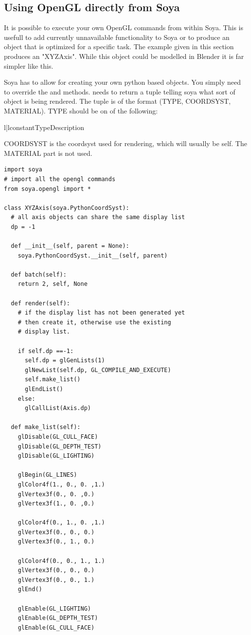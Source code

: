 \subsection{Using OpenGL directly from Soya}

It is possible to execute your own OpenGL commands from within Soya. This is 
usefull to add currently unnavailable functionality to Soya or to produce an 
object that is optimized for a specific task. The example given in this section
produces an "XYZAxis". While this object could be modelled in Blender it is far 
simpler like this. 

Soya has  to allow for creating your own python 
based objects. You simply need to override the  and 
 methods.  needs to return a tuple 
telling soya what sort of object is being rendered. The tuple is 
of the format (TYPE, COORDSYST, MATERIAL). TYPE should be on of the following:
\begin{tableii}{l|l}{constant}{Type}{Description}
\end{tableii}

COORDSYST is the coordsyst used for rendering, which will usually be self.
The MATERIAL part is not used. 

\begin{verbatim}
import soya
# import all the opengl commands
from soya.opengl import *

class XYZAxis(soya.PythonCoordSyst):
  # all axis objects can share the same display list
  dp = -1

  def __init__(self, parent = None):
    soya.PythonCoordSyst.__init__(self, parent)

  def batch(self):
    return 2, self, None

  def render(self):
    # if the display list has not been generated yet 
    # then create it, otherwise use the existing 
    # display list. 

    if self.dp ==-1:
      self.dp = glGenLists(1)
      glNewList(self.dp, GL_COMPILE_AND_EXECUTE)
      self.make_list()
      glEndList()
    else:
      glCallList(Axis.dp)

  def make_list(self):
    glDisable(GL_CULL_FACE)
    glDisable(GL_DEPTH_TEST)
    glDisable(GL_LIGHTING)

    glBegin(GL_LINES)
    glColor4f(1., 0., 0. ,1.)
    glVertex3f(0., 0. ,0.)
    glVertex3f(1., 0. ,0.)
    
    glColor4f(0., 1., 0. ,1.)
    glVertex3f(0., 0., 0.)
    glVertex3f(0., 1., 0.)
    
    glColor4f(0., 0., 1., 1.)
    glVertex3f(0., 0., 0.)
    glVertex3f(0., 0., 1.)
    glEnd()

    glEnable(GL_LIGHTING)
    glEnable(GL_DEPTH_TEST)
    glEnable(GL_CULL_FACE)

\end{verbatim}

